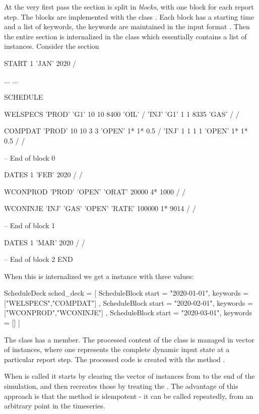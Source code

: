 At the very first pass the  section is split in \emph{blocks}, with
one block for each report step. The blocks are implemented with the class
. Each block has a starting time and a list of
keywords, the keywords are maintained in the input format
. Then the entire  section is internalized
in the class  which essentially contains a list of
 instances. Consider the  section
\begin{deck}
START
  1 'JAN' 2020 /

...
...

SCHEDULE

WELSPECS
	'PROD'	'G1'	10	10	8400	'OIL' /
	'INJ'	'G1'	1	1	8335	'GAS' /
/

COMPDAT
	'PROD'	10	10	3	3	'OPEN'	1*	1*	0.5 /
	'INJ'	1	1	1	1	'OPEN'	1*	1*	0.5 /
/

-- End of block 0

DATES
   1 'FEB' 2020 /
/

WCONPROD
	'PROD' 'OPEN' 'ORAT' 20000 4* 1000 /
/

WCONINJE
	'INJ'	'GAS'	'OPEN'	'RATE'	100000 1* 9014 /
/

-- End of block 1

DATES
  1 'MAR' 2020 /
/

-- End of block 2
END

\end{deck}

When this is internalized we get a  instance with three
 values:

\begin{code}
ScheduleDeck sched_deck = [
  ScheduleBlock {
    start = "2020-01-01",
    keywords = ["WELSPECS","COMPDAT"]
  },
  ScheduleBlock {
    start = "2020-02-01",
    keywords = ["WCONPROD","WCONINJE"]
  },
  ScheduleBlock {
    start = "2020-03-01",
    keywords = []
  }
]
\end{code}

The  class has a  member. The
processed content of the  class is managed in vector of
 instances, where one 
represents the complete dynamic input state at a particular report step. The
processed  code is created with the method
.

When  is called it
starts by clearing the vector of  instances from
 to the end of the simulation, and then recreates those
by treating the . The advantage of this approach is
that the  method is
idempotent - it can be called repeatedly, from an arbitrary point in the
timeseries.

